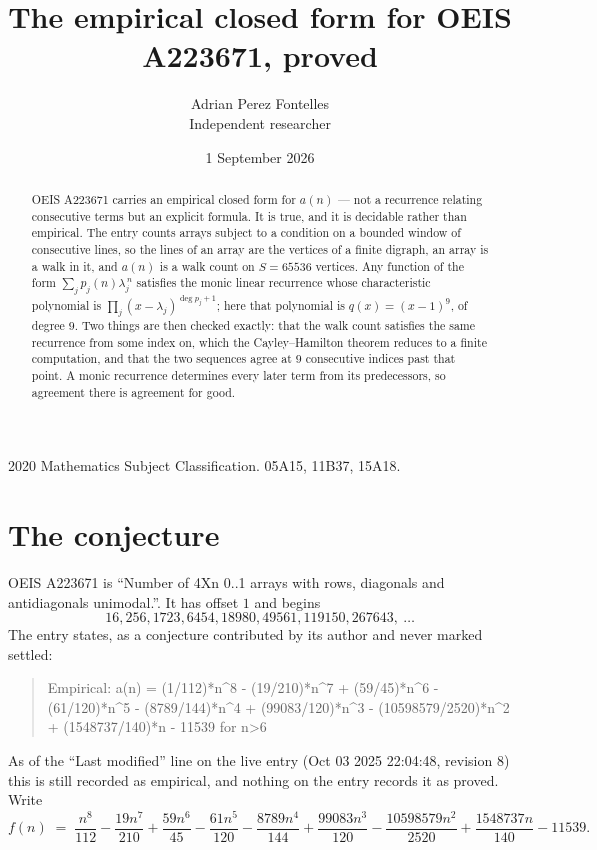 \documentclass[11pt,a4paper]{article}
\title{The empirical closed form for OEIS A223671, proved}
\author{Adrian Perez Fontelles\\ \small Independent researcher}
\date{1 September 2026}
\theoremstyle{plain}
\theoremstyle{definition}
\begin{document}
\maketitle

\begin{abstract}
OEIS A223671 carries an empirical closed form for $a(n)$ --- not a recurrence relating
consecutive terms but an explicit formula. It is true, and it is decidable rather than
empirical. The entry counts arrays subject to a condition on a bounded window of consecutive lines, so the lines of an array are the
vertices of a finite digraph, an array is a walk in it, and $a(n)$ is a walk count on
$S=65536$ vertices. Any function of the form $\sum_j p_j(n)\lambda_j^{\,n}$ satisfies the
monic linear recurrence whose characteristic polynomial is
$\prod_j(x-\lambda_j)^{\deg p_j+1}$; here that polynomial is $q(x)=(x-1)^{9}$, of degree
$9$. Two things are then checked exactly: that the walk count satisfies the same
recurrence from some index on, which the Cayley--Hamilton theorem reduces to a finite
computation, and that the two sequences agree at $9$ consecutive indices past that
point. A monic recurrence determines every later term from its predecessors, so agreement
there is agreement for good.
\end{abstract}

\noindent\small 2020 Mathematics Subject Classification. 05A15, 11B37, 15A18.\normalsize

\section{The conjecture}

OEIS A223671 is ``Number of 4Xn 0..1 arrays with rows, diagonals and antidiagonals unimodal.''. It has offset $1$ and begins
\[
16, 256, 1723, 6454, 18980, 49561, 119150, 267643,\ \dots
\]
The entry states, as a conjecture contributed by its author and never marked settled:
\begin{quote}
Empirical: a(n) = (1/112)*n\^{}8 - (19/210)*n\^{}7 + (59/45)*n\^{}6 - (61/120)*n\^{}5 - (8789/144)*n\^{}4 + (99083/120)*n\^{}3 - (10598579/2520)*n\^{}2 + (1548737/140)*n - 11539 for n>6
\end{quote}
As of the ``Last modified'' line on the live entry (Oct 03 2025 22:04:48, revision 8) this is still
recorded as empirical, and nothing on the entry records it as proved. Write
\[
f(n)\;=\;\frac{n^{8}}{112} - \frac{19 n^{7}}{210} + \frac{59 n^{6}}{45} - \frac{61 n^{5}}{120} - \frac{8789 n^{4}}{144} + \frac{99083 n^{3}}{120} - \frac{10598579 n^{2}}{2520} + \frac{1548737 n}{140} - 11539.
\]
\end{document}

